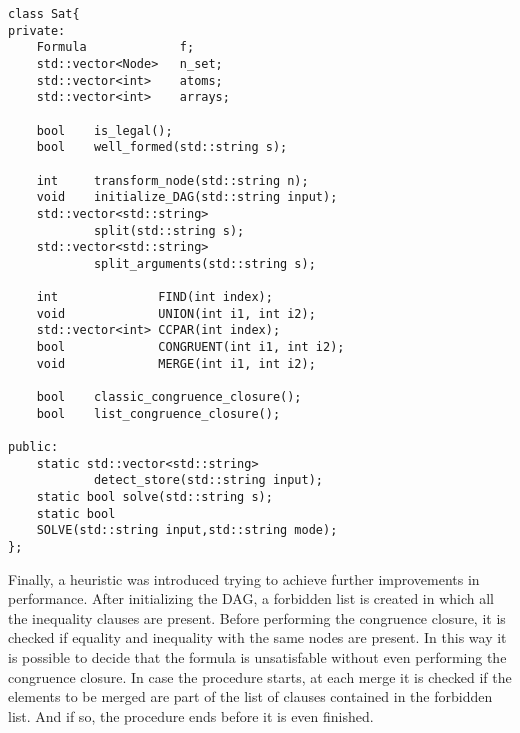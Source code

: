 \documentclass{IEEEtran}
\begin{document}
\begin{lstlisting}[style=cpp]
class Sat{
private:
	Formula 			f;
	std::vector<Node> 	n_set;
	std::vector<int> 	atoms;
	std::vector<int> 	arrays;

	bool	is_legal();
	bool 	well_formed(std::string s);
	
	int 	transform_node(std::string n);
	void 	initialize_DAG(std::string input);
	std::vector<std::string> 
			split(std::string s);
	std::vector<std::string> 
			split_arguments(std::string s);

	int 			 FIND(int index);
	void 			 UNION(int i1, int i2);
	std::vector<int> CCPAR(int index);
	bool 			 CONGRUENT(int i1, int i2);
	void 			 MERGE(int i1, int i2);

	bool 	classic_congruence_closure();
	bool 	list_congruence_closure();
	
public:
	static std::vector<std::string> 
			detect_store(std::string input);
	static bool solve(std::string s);
	static bool 
	SOLVE(std::string input,std::string mode);
};
\end{lstlisting}
Finally, a heuristic was introduced trying to achieve further improvements in performance. After initializing the DAG, a forbidden list is created in which all the inequality clauses are present. Before performing the congruence closure, it is checked if equality and inequality with the same nodes are present. In this way it is possible to decide that the formula is unsatisfable without even performing the congruence closure. In case the procedure starts, at each merge it is checked if the elements to be merged are part of the list of clauses contained in the forbidden list. And if so, the procedure ends before it is even finished.
\end{document}

